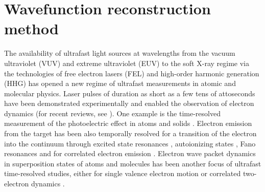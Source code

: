 \section{Wavefunction reconstruction method} %
\label{sec:wavefunction_reconstruction}
The availability of ultrafast light sources at wavelengths from the vacuum ultraviolet (VUV) and extreme ultraviolet (EUV) to the soft X-ray regime via the technologies of free electron lasers (FEL) \cite{seddon2017} and high-order harmonic generation (HHG) \cite{popmintchev2010,chini2014} has opened a new regime of ultrafast measurements in atomic and molecular physics. Laser pulses of duration as short as a few tens of attoseconds have been demonstrated experimentally \cite{zhao2012,chen2014} and enabled the observation of electron dynamics (for recent reviews, see \cite{vrakking2014,pazourek2015,calegari2016,ramasesha2016,young2018,peng2019}). One example is the time-resolved measurement of the photoelectric effect in atoms and solids \cite{cavalieri2007,schultze2010,klunder2011,tao2016,isinger2017}. Electron emission from the target has been also temporally resolved for a transition of the electron into the continuum through excited state resonances \cite{su2015,Sabbar2015,Gong2017}, autoionizing states \cite{jimenez2014,Dolmatov2015,Barreau2019}, Fano resonances \cite{kaldun2016,kotur2016,gruson2016,cirelli2018} and for correlated electron emission \cite{pfeiffer2011,pazourek2012,mansson2014}. Electron wave packet dynamics in superposition states of atoms and molecules has been another focus of ultrafast time-resolved studies, either for single valence electron motion \cite{goulielmakis2010,Mauritsson2010,holler2011,hockett2011,Kim2012,xie2012,klunder2013,beck2014,hassan2016,walt2017,priebe2017,He2018} or correlated two-electron dynamics \cite{hu2006,feist2011,ott2014}.

